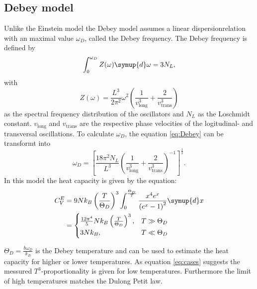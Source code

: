 \subsection{Debey model}
Unlike the Einstein model the Debey model assumes a linear dispersionrelation with an maximal value $\omega_D$, called the Debey frequency.
The Debey frequency is defined by
\begin{equation}
    \label{eq:Debey}
    \int_0^{\omega_D}Z(\omega) \symup{d}\omega = 3 N_L,
\end{equation}
with 
\begin{equation}
    Z(\omega) = \frac{L^3}{2\pi^2}\omega^2\left(\frac{1}{v_\text{long}^3}+\frac{2}{v_\text{trans}^3}\right)
\end{equation} 
as the spectral frequency distribution of the oscillators and $N_L$ as the Loschmidt constant.
$v_\text{long}$ and $v_\text{trans}$ are the respective phase velocities of the logitudinal- and transversal oscillations.
To calculate $\omega_D$, the equation \eqref{eq:Debey} can be transformt into
\begin{equation}
    \omega_D = \left[\frac{18\pi^2N_L}{L^3}\left(\frac{1}{v_\text{long}^3}+\frac{2}{v_\text{trans}^3}\right)^{-1}\right]^\frac{1}{3}.
\end{equation}
In this model the heat capacity is given by the equation:
\begin{align}
    C_V^E &= 9Nk_B\left(\frac{T}{\Theta_D}\right)^3 \int_0^{\frac{\Theta_D}{T}}\frac{x^4e^x}{\left(e^x-1\right)^2} \symup{d}x \\
    & =
    \begin{cases}
    \frac{12\pi^4}{5}Nk_B\left(\frac{T}{\Theta_D}\right)^3 , & T \gg \Theta_D \\
    3Nk_B , & T \ll \Theta_D \label{eq:cases}
    \end{cases}
\end{align}

$\Theta_D=\frac{\hbar \omega_D}{k_B}$ is the Debey temperature and can be used to estimate the heat capacity for higher or lower temperatures.
As equation \eqref{eq:cases} suggests the messured $T^3$-proportionality is given for low temperatures. 
Furthermore the limit of high temperatures matches the Dulong Petit law.







